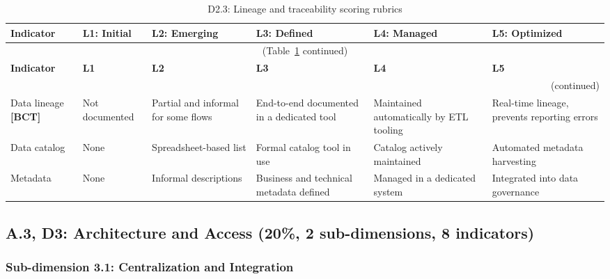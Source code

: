 \begin{center}
{\small
\begin{longtable}{|p{2.4cm}|p{2.0cm}|p{2.0cm}|p{2.2cm}|p{2.2cm}|p{2.2cm}|}
\caption{D2.3: Lineage and traceability scoring rubrics} \label{tab:d2-3} \\
\hline
\textbf{Indicator} & \textbf{L1: Initial} & \textbf{L2: Emerging} & \textbf{L3: Defined} & \textbf{L4: Managed} & \textbf{L5: Optimized} \\
\hline
\endfirsthead
\multicolumn{6}{c}{\small (Table~\ref{tab:d2-3} continued)} \\
\hline
\textbf{Indicator} & \textbf{L1} & \textbf{L2} & \textbf{L3} & \textbf{L4} & \textbf{L5} \\
\hline
\endhead
\hline
\multicolumn{6}{r}{\small (continued)} \\
\endfoot
\hline
\endlastfoot
Data lineage \textbf{[BCT]} &
  Not documented &
  Partial and informal for some flows &
  End-to-end documented in a dedicated tool &
  Maintained automatically by ETL tooling &
  Real-time lineage, prevents reporting errors \\
\hline
Data catalog &
  None &
  Spreadsheet-based list &
  Formal catalog tool in use &
  Catalog actively maintained &
  Automated metadata harvesting \\
\hline
Metadata &
  None &
  Informal descriptions &
  Business and technical metadata defined &
  Managed in a dedicated system &
  Integrated into data governance \\
\hline
\end{longtable}
}
\end{center}


\subsection*{A.3, D3: Architecture and Access (20\%, 2 sub-dimensions, 8 indicators)}

\subsubsection*{Sub-dimension 3.1: Centralization and Integration}

